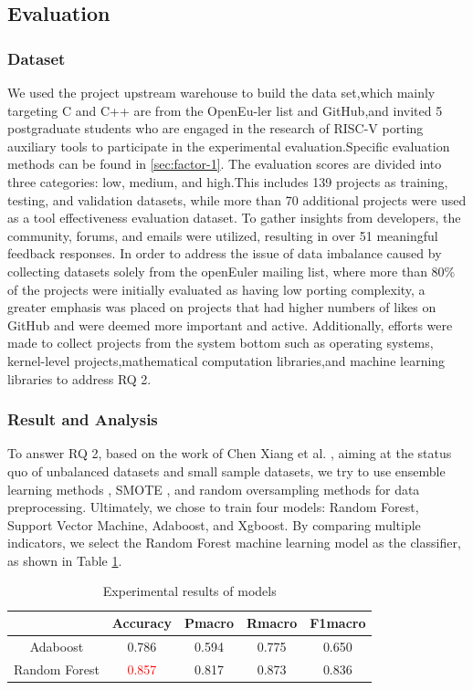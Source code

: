 \documentclass[sigconf,screen,review,anonymous]{acmart}
\begin{document}
\subsection{Evaluation}
\subsubsection{Dataset}
We used the project upstream warehouse to build the data set,which mainly targeting C and C++ are from the OpenEu-ler list and GitHub,and invited 5 postgraduate students who are engaged in the research of RISC-V porting auxiliary tools to participate in the experimental evaluation.Specific evaluation methods can be found in \ref{sec:factor-1}. The evaluation scores are divided into three categories: low, medium, and high\citep{githuburl}.This includes 139 projects as training, testing, and validation datasets, while more than 70 additional projects were used as a tool effectiveness evaluation dataset. To gather insights from developers, the community, forums, and emails were utilized, resulting in over 51 meaningful feedback responses. In order to address the issue of data imbalance caused by collecting datasets solely from the openEuler mailing list, where more than 80\% of the projects were initially evaluated as having low porting complexity, a greater emphasis was placed on projects that had higher numbers of likes on GitHub and were deemed more important and active. Additionally, efforts were made to collect projects from the system bottom such as operating systems, kernel-level projects,mathematical computation libraries,and machine learning libraries to address RQ 2.
\subsubsection{Result and Analysis}
To answer RQ 2, based on the work of Chen Xiang et al. \cite{5128907}, aiming at the status quo of unbalanced datasets and small sample datasets, we try to use ensemble learning methods \cite{6509481}, SMOTE \cite{4271036}, and random oversampling methods for data preprocessing.
Ultimately, we chose to train four models: Random Forest, Support Vector Machine, Adaboost, and Xgboost.
By comparing multiple indicators, we select the Random Forest machine learning model as the classifier, as shown in Table \ref{tab:evaluation}.

\begin{table}
  \caption{Experimental results of models}
  \label{tab:evaluation}
  \begin{tabular}{ccccc}
    \toprule
     & Accuracy & Pmacro & Rmacro & F1macro \\
    \midrule
    Adaboost & 0.786 & 0.594 & 0.775 & 0.650 \\
    Random Forest & \textcolor{red}{0.857} & 0.817 & 0.873 & 0.836 \\
  \bottomrule
\end{tabular}
\end{table}
\end{document}
